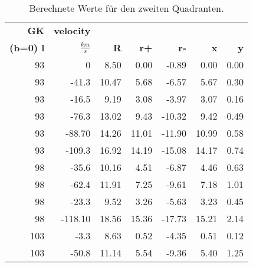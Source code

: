 \newpage
\begin{table}[H]
    \centering
    \caption{Berechnete Werte für den zweiten Quadranten.}
\begin{tabular}{|r|r|r|r|r|r|r|}
    \hline
    {\textbf{GK}} & {\textbf{velocity}} & {} &   {} &   {} &    {} &    {} \\
    {\textbf{(b=0) l}} & {\textbf{$\si{}{\frac{km}{s}}$}} & {\textbf{R}} &   {\textbf{r+}} &   {\textbf{r-}} &    {\textbf{x}} &    {\textbf{y}} \\
    \hline
            93 &          0 &       8.50 &       0.00 &      -0.89 &       0.00 &       0.00 \\
    
            93 &      -41.3 &      10.47 &       5.68 &      -6.57 &       5.67 &       0.30 \\
    
            93 &      -16.5 &       9.19 &       3.08 &      -3.97 &       3.07 &       0.16 \\
    
            93 &      -76.3 &      13.02 &       9.43 &     -10.32 &       9.42 &       0.49 \\
    
            93 &     -88.70 &      14.26 &      11.01 &     -11.90 &      10.99 &       0.58 \\
    
            93 &     -109.3 &      16.92 &      14.19 &     -15.08 &      14.17 &       0.74 \\
    \hline
            98 &      -35.6 &      10.16 &       4.51 &      -6.87 &       4.46 &       0.63 \\
    
            98 &      -62.4 &      11.91 &       7.25 &      -9.61 &       7.18 &       1.01 \\
    
            98 &      -23.3 &       9.52 &       3.26 &      -5.63 &       3.23 &       0.45 \\
    
            98 &    -118.10 &      18.56 &      15.36 &     -17.73 &      15.21 &       2.14 \\
    \hline
           103 &       -3.3 &       8.63 &       0.52 &      -4.35 &       0.51 &       0.12 \\
    
           103 &      -50.8 &      11.14 &       5.54 &      -9.36 &       5.40 &       1.25 \\
    

\end{tabular}
\end{table}
